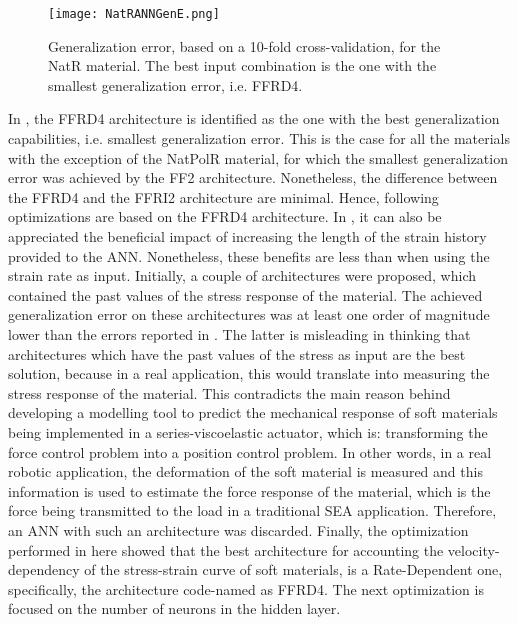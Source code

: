 \begin{figure}[htbp!]
    \centering
    \texttt{[image: NatRANNGenE.png]}
    \caption{Generalization error, based on a 10-fold cross-validation, for the NatR material. The best input combination is the one with the smallest generalization error, i.e. FFRD4.}
    \label{fig:ANNGenNatR}
\end{figure}

In , the FFRD4 architecture is identified as the one with the best generalization capabilities, i.e. smallest generalization error. This is the case for all the materials with the exception of the NatPolR material, for which the smallest generalization error was achieved by the FF2 architecture. Nonetheless, the difference between the FFRD4 and the FFRI2 architecture are minimal. Hence, following optimizations are based on the FFRD4 architecture. 
In , it can also be appreciated the beneficial impact of increasing the length of the strain history provided to the ANN. Nonetheless, these benefits are less than when using the strain rate as input. Initially, a couple of architectures were proposed, which contained the past values of the stress response of the material. The achieved generalization error on these architectures was at least one order of magnitude lower than the errors reported in . The latter is misleading in thinking that architectures which have the past values of the stress as input are the best solution, because in a real application, this would translate into measuring the stress response of the material. This contradicts the main reason behind developing a modelling tool to predict the mechanical response of soft materials being implemented in a series-viscoelastic actuator, which is: transforming the force control problem into a position control problem. In other words, in a real robotic application, the deformation of the soft material is measured and this information is used to estimate the force response of the material, which is the force being transmitted to the load in a traditional SEA application. Therefore, an ANN with such an architecture was discarded. Finally, the optimization performed in here showed that the best architecture for accounting the velocity-dependency of the stress-strain curve of soft materials, is a Rate-Dependent one, specifically, the architecture code-named as FFRD4. The next optimization is focused on the number of neurons in the hidden layer.

